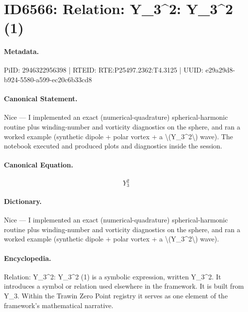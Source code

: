 \section*{ID6566: Relation: Y\_3\textasciicircum{}2: Y\_3\textasciicircum{}2 (1)}
\paragraph{Metadata.}
PiID: 2946322956398 | RTEID: RTE:P25497.2362:T4.3125 | UUID: e29a29d8-b924-5580-a599-ec20c6b33cd8

\paragraph{Canonical Statement.}
Nice — I implemented an exact (numerical-quadrature) spherical-harmonic routine plus winding-number and vorticity diagnostics on the sphere, and ran a worked example (synthetic dipole + polar vortex + a \textbackslash{}(Y\_3\textasciicircum{}2\textbackslash{}) wave). The notebook executed and produced plots and diagnostics inside the session.

\paragraph{Canonical Equation.}
\[
Y_3^2
\]

\paragraph{Dictionary.}
Nice — I implemented an exact (numerical-quadrature) spherical-harmonic routine plus winding-number and vorticity diagnostics on the sphere, and ran a worked example (synthetic dipole + polar vortex + a \textbackslash{}(Y\_3\textasciicircum{}2\textbackslash{}) wave).

\paragraph{Encyclopedia.}
Relation: Y\_3\textasciicircum{}2: Y\_3\textasciicircum{}2 (1) is a symbolic expression, written Y\_3\textasciicircum{}2. It introduces a symbol or relation used elsewhere in the framework. It is built from Y\_3. Within the Trawin Zero Point registry it serves as one element of the framework's mathematical narrative.
